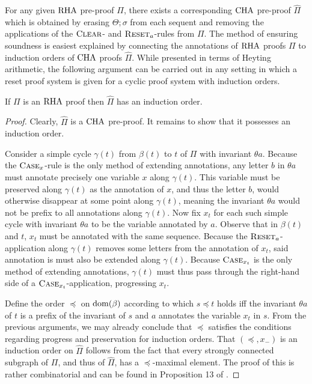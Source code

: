For any given $\mathrm{RHA}$ pre-proof $\Pi$, there exists a corresponding $\mathrm{CHA}$
pre-proof $\widehat\Pi$ which is obtained by erasing $\Theta;
\sigma$ from each sequent and removing the applications of the $\textsc{Clear}$- and $\textsc{Reset}_a$-rules from $\Pi$.
The method of ensuring soundness is easiest explained by connecting the annotations of
$\mathrm{RHA}$ proofs $\Pi$ to induction orders of $\mathrm{CHA}$ proofs $\widehat\Pi$. While
presented in terms of Heyting arithmetic, the following argument can be carried
out in any setting in which a reset proof system is given for a cyclic proof
system with induction orders.

\begin{proposition}
  If $\Pi$ is an $\mathrm{RHA}$ proof then $\widehat\Pi$ has an induction order.
\end{proposition}
\begin{proof}
  Clearly, $\widehat\Pi$ is a $\mathrm{CHA}$ pre-proof. It remains to show that it
  possesses an induction order.

  Consider a simple
  cycle $\gamma(t)$ from $\beta(t)$ to $t$ of $\Pi$ with invariant $\theta a$. Because the
  $\textsc{Case}_x$-rule is the only method of extending annotations, any letter $b$ in
  $\theta a$ must annotate precisely one variable $x$ along $\gamma(t)$. This
  variable must be preserved along $\gamma(t)$ as the annotation of $x$, and thus
  the letter $b$, would otherwise disappear at some point along $\gamma(t)$, meaning the
  invariant $\theta a$ would not be prefix to all annotations along $\gamma(t)$.
  Now fix $x_t$ for each such simple cycle with invariant $\theta a$ to be the
  variable annotated by $a$. Observe that in $\beta(t)$ and $t$, $x_t$ must be
  annotated with the same sequence. Because the $\textsc{Reset}_a$-application
  along $\gamma(t)$ removes some letters from the annotation of $x_t$,
  said annotation is must also be extended along $\gamma(t)$. Because
  $\textsc{Case}_{x_t}$ is the only method of
  extending annotations, $\gamma(t)$ must thus pass through the right-hand side of a
  $\textsc{Case}_{x_t}$-application, progressing $x_t$.

  Define the order $\preceq$ on $\mathrm{dom}(\beta)$ according to
  which $s \preceq t$ holds iff the invariant $\theta a$ of $t$ is a prefix of the invariant
  of $s$ and $a$ annotates the variable $x_t$ in $s$.
  From the previous arguments, we may already conclude that $\preceq$ satisfies
  the conditions regarding progress and preservation for induction orders.
  That $(\preceq, x_{-})$ is an induction order on $\widehat\Pi$ follows from
  the fact that 
  every strongly connected subgraph of $\Pi$, and thus of $\widehat\Pi$, has a $\preceq$-maximal element.
  The proof of this is rather combinatorial and can be found in
  Proposition 13 of \papOne{}.
\end{proof}

